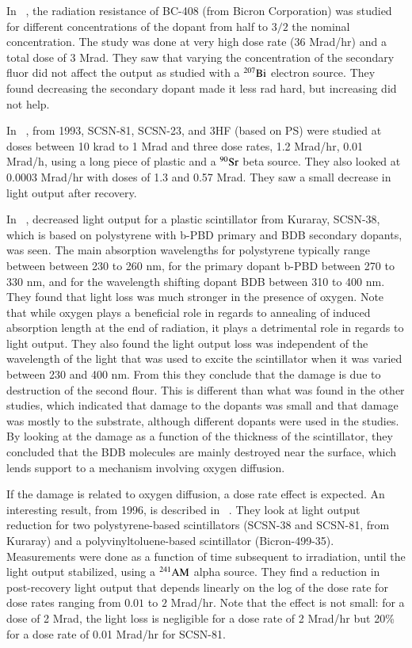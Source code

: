 \documentclass[review]{elsarticle}
\begin{document}
In ~\cite{Majewski1989500}, the radiation resistance of BC-408 (from Bicron Corporation) was studied for different concentrations of the dopant from half to $3/2$ the nominal concentration.  The study was done at very high dose rate (36 Mrad/hr) and a total dose of 3 Mrad.  They saw that varying the concentration of the secondary fluor did not affect the output as studied with a $\rm{^{207}Bi}$ electron source.  They found decreasing the secondary dopant made it less rad hard, but increasing did not help.  

In ~\cite{Giokaris1993315}, from 1993, SCSN-81, SCSN-23, and 3HF (based on PS) were studied at doses between 10 krad to 1 Mrad and three dose rates, 1.2 Mrad/hr, 0.01 Mrad/h, using a long piece of plastic and a ${\rm ^{90}Sr}$ beta source.
They also looked at 0.0003 Mrad/hr with doses of 1.3 and 0.57 Mrad.
They saw a small decrease in light output after recovery.

In ~\cite{Wick1991472}, decreased light
output for a plastic scintillator from Kuraray, SCSN-38, which
is based on polystyrene with b-PBD primary and BDB secondary dopants, was seen.
The main absorption wavelengths for polystyrene typically range between
between 230 to 260 nm, for the primary dopant b-PBD between 270 to 330 nm,
and for the wavelength shifting dopant BDB between 310 to 400 nm.
They found that light loss was much stronger in the presence of oxygen.
Note that while oxygen plays a beneficial role in regards
to annealing of induced absorption length at the end of radiation, 
it plays a detrimental role in 
regards to light output.  
They also found the light output loss
was independent of the wavelength of the light
that was used to excite the scintillator when it
was varied between 230 and 400 nm.
From this they conclude that the damage is due to destruction
of the second flour.  This is different than what was found in
the other studies, which indicated that damage to the dopants was
small and that damage was mostly to the substrate,
although different dopants were used in the studies.
By looking at the damage as a function of the thickness of the scintillator,
they concluded that the BDB molecules are mainly destroyed
near the surface, which lends support to a mechanism involving
oxygen diffusion.

If the damage is related to oxygen diffusion, a dose rate effect
is expected.
An interesting result, from 1996, is described in ~\cite{Biagtan1996125}.  They look at light output reduction for two
polystyrene-based scintillators (SCSN-38 and SCSN-81, from Kuraray) and a
polyvinyltoluene-based scintillator (Bicron-499-35).  
Measurements were done as a function of time subsequent to irradiation, until the light output stabilized, using a ${\rm ^{241}AM}$ alpha source.
They find a reduction in post-recovery light output that depends linearly on the
log of the dose rate for dose rates ranging from $0.01$ to
$2$ Mrad/hr.  Note that the effect is not small: for a
dose of 2 Mrad, the light loss is negligible for a dose rate
of 2 Mrad/hr but 20\% for a dose rate of 0.01 Mrad/hr for SCSN-81.
\end{document}
